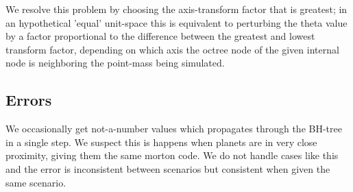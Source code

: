 We resolve this problem by choosing the axis-transform factor that is greatest;
in an hypothetical 'equal' unit-space this is equivalent to perturbing the theta
value by a factor proportional to the difference between the greatest and lowest
transform factor, depending on which axis the octree node of the given internal node
is neighboring the point-mass being simulated.


\subsection{Errors}\label{sec:errors}
We occasionally get not-a-number values which propagates through the BH-tree in
a single step. We suspect this is happens when planets are in very close
proximity, giving them the same morton code. We do not handle cases like this
and the error is inconsistent between scenarios but consistent when given the
same scenario.

